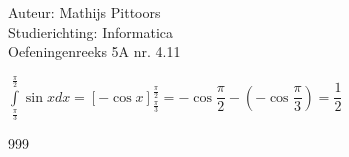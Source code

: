 \documentclass[a4paper]{article}
\newcommand{\bepint}{\displaystyle\int\limits}
\begin{document}
  
\noindent \large Auteur: Mathijs Pittoors \\
\noindent \large Studierichting: Informatica\\
\noindent \large Oefeningenreeks 5A nr. 4.11\\

\medskip

\normalsize

$\bepint_\tfrac{\pi}{3}^\tfrac{\pi}{2} \sin x dx = [- \cos x]_\tfrac{\pi}{3}^\tfrac{\pi}{2} = - \cos \dfrac{\pi}{2} - \left(- \cos \dfrac{\pi}{3}\right) = \dfrac{1}{2}$

\begin{thebibliography}{999}
\end{thebibliography}
\end{document}
